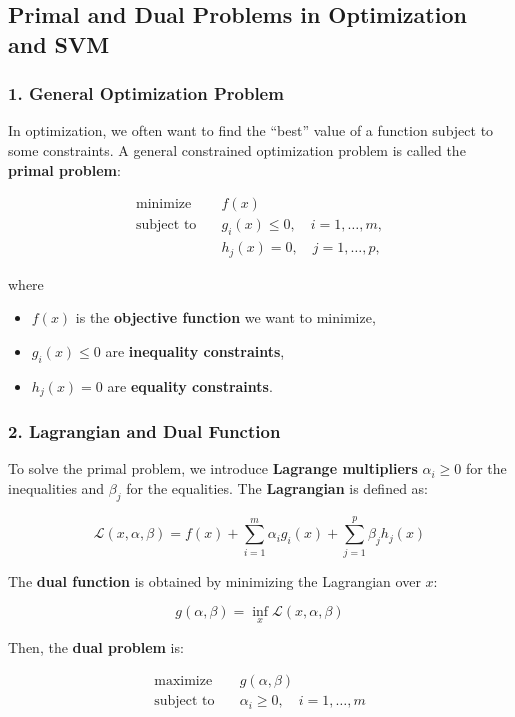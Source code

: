\subsection{Primal and Dual Problems in Optimization and SVM}

\subsubsection*{1. General Optimization Problem}

In optimization, we often want to find the ``best'' value of a function subject to some constraints.  
A general constrained optimization problem is called the \textbf{primal problem}:

\[
\begin{aligned}
\text{minimize} \quad & f(x) \\
\text{subject to} \quad & g_i(x) \le 0, \quad i=1,\dots,m,\\
& h_j(x) = 0, \quad j=1,\dots,p,
\end{aligned}
\]

where
\begin{itemize}
    \item $f(x)$ is the \textbf{objective function} we want to minimize,
    \item $g_i(x) \le 0$ are \textbf{inequality constraints},
    \item $h_j(x) = 0$ are \textbf{equality constraints}.
\end{itemize}

\subsubsection*{2. Lagrangian and Dual Function}

To solve the primal problem, we introduce \textbf{Lagrange multipliers} $\alpha_i \ge 0$ for the inequalities and $\beta_j$ for the equalities.  
The \textbf{Lagrangian} is defined as:

\[
\mathcal{L}(x, \alpha, \beta) = f(x) + \sum_{i=1}^m \alpha_i g_i(x) + \sum_{j=1}^p \beta_j h_j(x)
\]

The \textbf{dual function} is obtained by minimizing the Lagrangian over $x$:

\[
g(\alpha, \beta) = \inf_x \mathcal{L}(x, \alpha, \beta)
\]

Then, the \textbf{dual problem} is:

\[
\begin{aligned}
\text{maximize} \quad & g(\alpha, \beta) \\
\text{subject to} \quad & \alpha_i \ge 0, \quad i=1,\dots,m
\end{aligned}
\]

